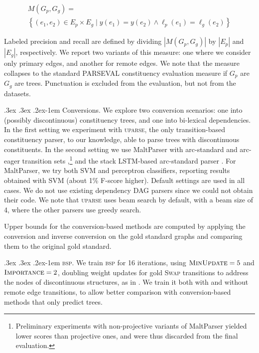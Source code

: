 \documentclass[11pt,letterpaper]{article}
\makeatletter
\renewcommand{\paragraph}{
  \@startsection{paragraph}{4}
  {\z@}{.3ex \@plus .3ex \@minus .2ex}{-1em}
  {\normalfont\normalsize\bfseries}
}
\makeatother
\begin{document}
\vspace{-.6cm}

{\small
\begin{multline*}
    M(G_p,G_g) = \\
    \left\{(e_1,e_2) \in E_p \times E_g \;|\;
    y(e_1) = y(e_2) \wedge \ell_p(e_1)=\ell_g(e_2)\right\}
\end{multline*}
}

\vspace{-.6cm}

Labeled precision and recall are defined by dividing $|M(G_p,G_g)|$ by $|E_p|$ and $|E_g|$, respectively.
We report two variants of this measure: one where we consider only primary edges,
and another for remote edges. We note that the measure collapses to the standard
PARSEVAL constituency evaluation measure if $G_p$ are $G_g$ are trees.
Punctuation is excluded from the evaluation, but not from the datasets.

\paragraph{Conversions.}
We explore two conversion scenarios: one into (possibly discontinuous) constituency trees,
and one into bi-lexical dependencies. In the first setting we experiment with \textsc{uparse},
the only transition-based constituency parser, to our knowledge, able to parse trees with
discontinuous constituents.
In the second setting we use MaltParser with arc-standard and
arc-eager transition sets \cite{nivre2007maltparser},\footnote{Preliminary
experiments with non-projective variants of MaltParser yielded lower scores than
projective ones, and were thus discarded from the final evaluation.}
and the stack LSTM-based arc-standard parser \cite{dyer2015transition}.
For MaltParser, we try both SVM and perceptron classifiers, reporting
results obtained with SVM (about 1\% F-score higher).
Default settings are used in all cases.
We do not use existing dependency DAG parsers since we could not obtain their code.
We note that \textsc{uparse} uses beam search by default,
with a beam size of 4, where the other parsers use greedy search.

Upper bounds for the conversion-based methods are computed by applying
the conversion and inverse conversion on the gold standard
graphs and comparing them to the original gold standard.

\paragraph{\textsc{bsp}.}
We train \textsc{bsp} for 16 iterations, using $\textsc{MinUpdate}=5$
and $\textsc{Importance}=2$, doubling weight updates
for gold \textsc{Swap} transitions to address the nodes
of discontinuous structures, as in .
We train it both with and without remote edge transitions,
to allow better comparison with conversion-based methods that only
predict trees.
\end{document}
